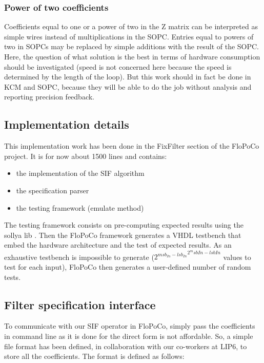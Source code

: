 	\subsubsection{Power of two coefficients}
		Coefficients equal to one or a power of two in the Z matrix can be interpreted as simple wires instead of multiplications in the SOPC.
		Entries equal to powers of two in SOPCs may be replaced by simple additions with the result of the SOPC.
		Here, the question of what solution is the best in terms of hardware consumption should be investigated
		(speed is not concerned here because the speed is determined by the length of the loop).
		But this work should in fact be done in KCM and SOPC, because they will be able to do the job without analysis and reporting precision feedback.

	\subsection{Implementation details}
	This implementation work has been done in the FixFilter section of the FloPoCo project.
	It is for now about 1500 lines and contains:
	\begin{itemize}
		\item the implementation of the SIF algorithm \vspace{-8pt}
		\item the specification parser \vspace{-8pt}
		\item the testing framework (emulate method)
	\end{itemize}

	The testing framework consists on pre-computing expected results using the sollya lib \cite{ChevillardJoldesLauter2010}.
	Then the FloPoCo framework generates a VHDL testbench that embed the hardware architecture and the test of expected results.
	As an exhaustive testbench is impossible to generate (${2^{msb_{In} - lsb_{In}}}^{2^msb{In} - lsb{In}}$ values to test for each input),
	FloPoCo then generates a user-defined number of random tests.

		\subsection{Filter specification interface}
		To communicate with our SIF operator in FloPoCo, simply pass the coefficients in command line as it is done for the direct form is not affordable.
		So, a simple file format has been defined, in collaboration with our co-workers at LIP6, to store all the coefficients.
		The format is defined as follows:
		\vspace{-10pt}

